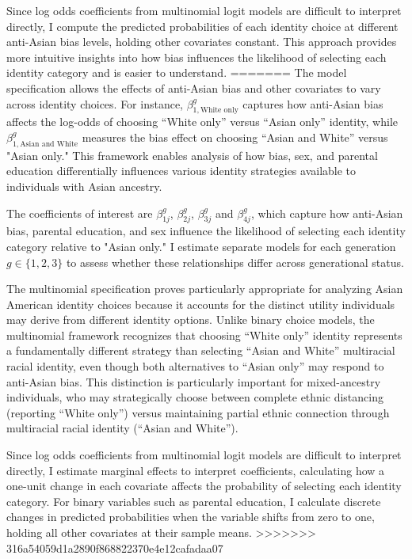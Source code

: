 Since log odds coefficients from multinomial logit models are difficult to interpret directly, I compute the predicted probabilities of each identity choice at different anti-Asian bias levels, holding other covariates constant. This approach provides more intuitive insights into how bias influences the likelihood of selecting each identity category and is easier to understand.
=======
The model specification allows the effects of anti-Asian bias and other covariates to vary across identity choices. For instance, $\beta_{1,\text{White only}}^g$ captures how anti-Asian bias affects the log-odds of choosing ``White only'' versus ``Asian only'' identity, while $\beta_{1,\text{Asian and White}}^g$ measures the bias effect on choosing ``Asian and White'' versus "Asian only." This framework enables analysis of how bias, sex, and parental education differentially influences various identity strategies available to individuals with Asian ancestry.

The coefficients of interest are $\beta_{1j}^g$, $\beta_{2j}^g$, $\beta_{3j}^g$ and $\beta_{4j}^g$, which capture how anti-Asian bias, parental education, and sex influence the likelihood of selecting each identity category relative to "Asian only." I estimate separate models for each generation $g \in \{1,2,3\}$ to assess whether these relationships differ across generational status.

The multinomial specification proves particularly appropriate for analyzing Asian American identity choices because it accounts for the distinct utility individuals may derive from different identity options. Unlike binary choice models, the multinomial framework recognizes that choosing ``White only'' identity represents a fundamentally different strategy than selecting ``Asian and White'' multiracial racial identity, even though both alternatives to ``Asian only'' may respond to anti-Asian bias. This distinction is particularly important for mixed-ancestry individuals, who may strategically choose between complete ethnic distancing (reporting ``White only'') versus maintaining partial ethnic connection through multiracial racial identity (``Asian and White'').

Since log odds coefficients from multinomial logit models are difficult to interpret directly, I estimate marginal effects to interpret coefficients, calculating how a one-unit change in each covariate affects the probability of selecting each identity category. For binary variables such as parental education, I calculate discrete changes in predicted probabilities when the variable shifts from zero to one, holding all other covariates at their sample means.
>>>>>>> 316a54059d1a2890f868822370e4e12cafadaa07

